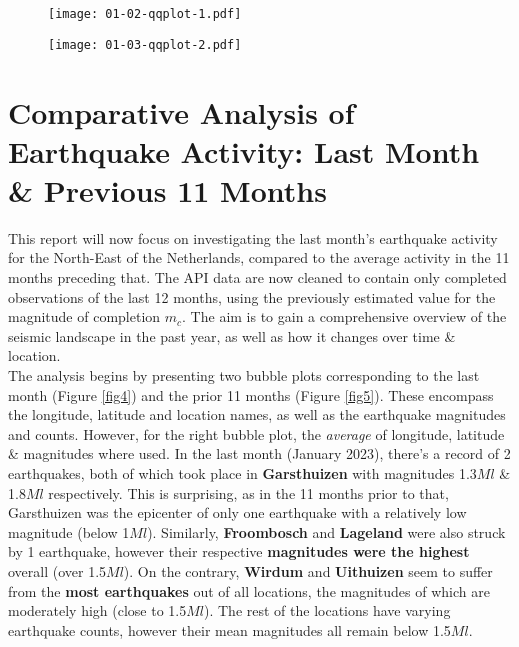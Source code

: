 \documentclass[a4paper]{article}
\begin{document}
\begin{figure}[H]
  \centering
  \begin{minipage}[b]{0.45\textwidth}
    \texttt{[image: 01-02-qqplot-1.pdf]}
    \caption{}
    \label{fig2}
  \end{minipage}
  \hfill
  \begin{minipage}[b]{0.45\textwidth}
    \texttt{[image: 01-03-qqplot-2.pdf]}
    \caption{}
    \label{fig3}
  \end{minipage}
\end{figure}
\clearpage
\section*{\centering\textnormal{Comparative Analysis of Earthquake Activity: Last Month \& Previous 11 Months}}
This report will now focus on investigating the last month's earthquake activity for the North-East of the Netherlands, compared to the average activity in the 11 months preceding that. The API data are now cleaned to contain only completed observations of the last 12 months, using the previously estimated value for the magnitude of completion $m_c$. The aim is to gain a comprehensive overview of the seismic landscape in the past year, as well as how it changes over time \& location. \\

\noindent The analysis begins by presenting two bubble plots corresponding to the last month (Figure \ref{fig4}) and the prior 11 months (Figure \ref{fig5}). These encompass the longitude, latitude and location names, as well as the earthquake magnitudes and counts. However, for the right bubble plot, the \textit{average} of longitude, latitude \& magnitudes where used. In the last month (January 2023), there's a record of 2 earthquakes, both of which took place in \textbf{Garsthuizen} with magnitudes 1.3$Ml$ \& 1.8$Ml$ respectively. This is surprising, as in the 11 months prior to that, Garsthuizen was the epicenter of only one earthquake with a relatively low magnitude (below 1$Ml$). Similarly, \textbf{Froombosch} and \textbf{Lageland} were also struck by 1 earthquake, however their respective \textbf{magnitudes were the highest} overall (over 1.5$Ml$). On the contrary, \textbf{Wirdum} and \textbf{Uithuizen} seem to suffer from the  \textbf{most earthquakes} out of all locations, the magnitudes of which are moderately high (close to 1.5$Ml$). The rest of the locations have varying earthquake counts, however their mean magnitudes all remain below 1.5$Ml$. \\
\end{document}
